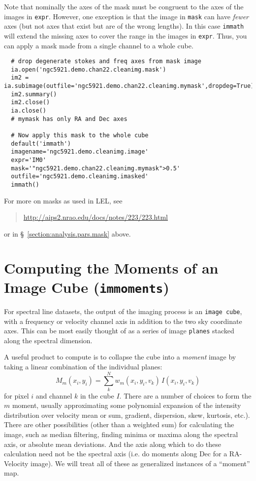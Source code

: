 Note that nominally the axes of the mask must be congruent to the axes
of the images in {\tt expr}.  However, one exception is that the image
in {\tt mask} can have {\em fewer} axes (but not axes that exist but
are of the wrong lengths).  In this case {\tt immath} will extend the
missing axes to cover the range in the images in {\tt expr}.
Thus, you can apply a mask made from a single channel to a whole cube.
\small
\begin{verbatim}
  # drop degenerate stokes and freq axes from mask image
  ia.open('ngc5921.demo.chan22.cleanimg.mask')
  im2 = ia.subimage(outfile='ngc5921.demo.chan22.cleanimg.mymask',dropdeg=True)
  im2.summary()
  im2.close()
  ia.close()
  # mymask has only RA and Dec axes

  # Now apply this mask to the whole cube
  default('immath')
  imagename='ngc5921.demo.cleanimg.image'
  expr='IM0'
  mask='"ngc5921.demo.chan22.cleanimg.mymask">0.5'
  outfile='ngc5921.demo.cleanimg.imasked'
  immath()
\end{verbatim}
\normalsize

For more on masks as used in LEL, see
\begin{quote}
   \url{http://aips2.nrao.edu/docs/notes/223/223.html}
\end{quote}
or in \S~\ref{section:analysis.pars.mask} above.





\section{Computing the Moments of an Image Cube ({\tt immoments})}
\label{section:analysis.moments}

For spectral line datasets, the output of the imaging process is an
{\tt image cube}, with a frequency or velocity channel axis in
addition to the two sky coordinate axes.  This can be most easily
thought of as a series of image {\tt planes} stacked along the
spectral dimension.

A useful product to compute is to collapse the cube into a 
{\it moment} image by taking a linear combination of the individual
planes:
\begin{equation}
   M_m(x_i,y_i) = \sum_k^N w_m(x_i,y_i,v_k)\,I(x_i,y_i,v_k)
\end{equation}
for pixel $i$ and channel $k$ in the cube $I$.  There are a number
of choices to form the $m$ moment, usually approximating some
polynomial expansion of the intensity distribution over velocity
mean or sum, gradient, dispersion, skew, kurtosis, etc.).  There
are other possibilities (other than a weighted sum) for calculating
the image, such as median filtering, finding minima or maxima along
the spectral axis, or absolute mean deviations.  And the axis along
which to do these calculation need not be the spectral axis (i.e.
do moments along Dec for a RA-Velocity image).  We will treat all
of these as generalized instances of a ``moment'' map.

